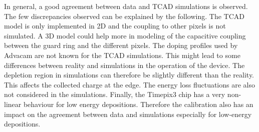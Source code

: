 In general, a good agreement between data and TCAD simulations is
observed. The few discrepancies observed can be explained by the
following. The TCAD model is only implemented in 2D and the coupling
to other pixels is not simulated. A 3D model could help more in
modeling of the capacitive coupling between the guard ring and the
different pixels. The doping profiles used by Advacam are not known
for the TCAD simulations. This might lead to some differences between
reality and simulations in the operation of the device. The depletion
region in simulations can therefore be slightly different than the
reality. This affects the collected charge at the edge. The energy
loss fluctuations are also not considered in the simulations. Finally,
the Timepix3 chip has a very non-linear behaviour for low energy
depositions. Therefore the calibration also has an impact on the
agreement between data and simulations especially for low-energy
depositions.









